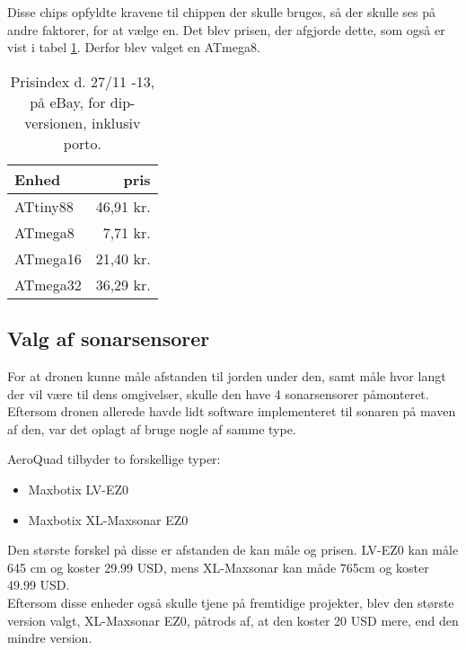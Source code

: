 \documentclass[Main]{subfiles}
\begin{document}
Disse chips opfyldte kravene til chippen der skulle bruges, så der skulle ses på andre faktorer, for at vælge en. 
Det blev prisen, der afgjorde dette, som også er vist i tabel \ref{Tab:prisIndex}.
Derfor blev valget en ATmega8.
\begin{table}[H]
\centering
	\begin{tabular}{l r}\hline
	Enhed & pris \\ \hline
	ATtiny88 & 46,91 kr.\\
	ATmega8  & 7,71 kr.\\
	ATmega16 & 21,40 kr.\\
	ATmega32 & 36,29 kr. \\ \hline
	\end{tabular}
\caption{Prisindex d. 27/11 -13, på eBay, for dip-versionen, inklusiv porto.}
\label{Tab:prisIndex}
\end{table}



\subsection{Valg af sonarsensorer}
For at dronen kunne måle afstanden til jorden under den, samt måle hvor langt der vil være til dens omgivelser, skulle den have 4 sonarsensorer påmonteret.
Eftersom dronen allerede havde lidt software implementeret til sonaren på maven af den, var det oplagt af bruge nogle af samme type.


AeroQuad tilbyder to forskellige typer: 
\begin{itemize}
\item Maxbotix LV-EZ0 \cite{LV-EZ0}
\item Maxbotix XL-Maxsonar EZ0 \cite{XL-EZ0}
\end{itemize}

Den største forskel på disse er afstanden de kan måle og prisen.
LV-EZ0 kan måle 645 cm og koster 29.99 USD, mens XL-Maxsonar kan måde 765cm og koster 49.99 USD.
\\
Eftersom disse enheder også skulle tjene på fremtidige projekter, blev den største version valgt, XL-Maxsonar EZ0, påtrods af, at den koster 20 USD mere, end den mindre version.
\end{document}
